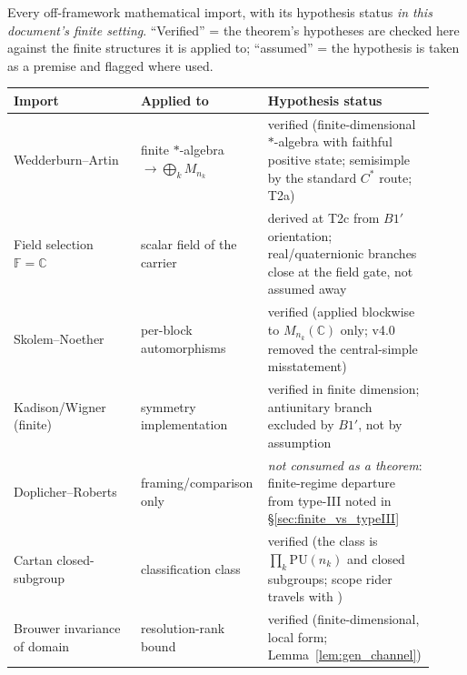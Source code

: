 \documentclass[11pt]{article}
\theoremstyle{definition}
\newcommand{\codeid}[1]{\texttt{\seqsplit{#1}}}%
\begin{document}
\begin{tcolorbox}[apfbox, title={Imported-ingredient hypothesis ledger (verified vs.\ assumed in the finite-cost environment)}]
\footnotesize
Every off-framework mathematical import, with its hypothesis status
\emph{in this document's finite setting}.  ``Verified'' = the theorem's
hypotheses are checked here against the finite structures it is applied
to; ``assumed'' = the hypothesis is taken as a premise and flagged where
used.

\smallskip
\begin{tabular}{@{}p{0.30\linewidth}p{0.30\linewidth}p{0.32\linewidth}@{}}
\toprule
\textbf{Import} & \textbf{Applied to} & \textbf{Hypothesis status} \\
\midrule
Wedderburn--Artin & finite $*$-algebra $\to \bigoplus_k M_{n_k}$ & verified (finite-dimensional $*$-algebra with faithful positive state; semisimple by the standard $C^*$ route; T2a) \\
Field selection $\mathbb{F}=\mathbb{C}$ & scalar field of the carrier & derived at T2c from $B1'$ orientation; real/quaternionic branches close at the field gate, not assumed away \\
Skolem--Noether & per-block automorphisms & verified (applied blockwise to $M_{n_k}(\mathbb{C})$ only; v4.0 removed the central-simple misstatement) \\
Kadison/Wigner (finite) & symmetry implementation & verified in finite dimension; antiunitary branch excluded by $B1'$, not by assumption \\
Doplicher--Roberts & framing/comparison only & \emph{not consumed as a theorem}: finite-regime departure from type-III noted in \S\ref{sec:finite_vs_typeIII} \\
Cartan closed-subgroup & classification class & verified (the class is $\prod_k \mathrm{PU}(n_k)$ and closed subgroups; scope rider travels with \codeid{check\_L\_cost\_gauge}) \\
Brouwer invariance of domain & resolution-rank bound & verified (finite-dimensional, local form; Lemma~\ref{lem:gen_channel}) \\
\bottomrule
\end{tabular}
\end{tcolorbox}
\end{document}
